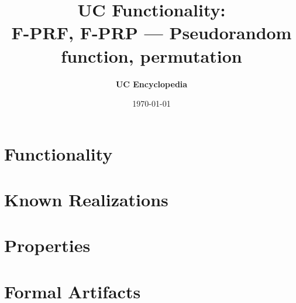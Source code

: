 \documentclass[11pt,a4paper]{article}
\title{\textbf{\Large UC Functionality:}\\[0.2em] \Large F-PRF, F-PRP --- Pseudorandom function, permutation}
\author{\textbf{UC Encyclopedia}}
\date{\today}
\newtheorem{functionality}{Functionality}
\begin{document}
\maketitle

\begin{abstract}
\end{abstract}

\section{Functionality}

%

\section{Known Realizations}


\section{Properties}


\section{Formal Artifacts}

\end{document}
